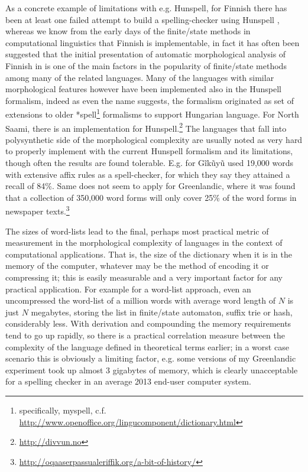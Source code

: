 \documentclass[officiallayout]{unihelcompling}
\begin{document}
As a concrete example of limitations with e.g. Hunspell, for Finnish there has
been at least one failed attempt to build a spelling-checker using Hunspell
\citep{pitkanen2006hunspell}, whereas we know from the early days of the
finite\-/state methods in computational linguistics that Finnish is
implementable, in fact it has often been suggested that the initial
presentation of automatic morphological analysis of Finnish in
\citet{koskenniemi1983twolevel} is one of the main factors in the popularity of
finite\-/state methods among many of the related languages. Many of the
languages with similar morphological features however have been implemented
also in the Hunspell formalism, indeed as even the name suggests, the formalism
originated as set of extensions to older *spell\footnote{specifically, 
    myspell, c.f.
\url{http://www.openoffice.org/lingucomponent/dictionary.html}} formalisms to
support Hungarian language.  For North Saami, there is an implementation for
Hunspell.\footnote{\url{http://divvun.no}} The languages that fall into polysynthetic side of the morphological
complexity are usually noted as very hard to properly implement with the
current Hunspell formalism and its limitations, though often the results are
found tolerable. E.g. for Gĩkũyũ \citet{chege2010developing} used 19,000 words
with extensive affix rules as a spell-checker, for which they say they attained
a recall of 84\%. Same does not seem to apply for Greenlandic, where it was
found that a collection of 350,000 word forms will only cover 25\% of the
word forms in newspaper
texts.\footnote{\url{http://oqaaserpassualeriffik.org/a-bit-of-history/}}

The sizes of word-lists lead to the final, perhaps most practical metric of
measurement in the morphological complexity of languages in the context of
computational applications. That is, the size of the dictionary when it is in
the memory of the computer, whatever may be the method of encoding it or
compressing it; this is easily measurable and a very important factor for any
practical application.  For example for a word-list approach, even an
uncompressed the word-list of a million words with average word length of $N$
is just $N$ megabytes, storing the list in finite\-/state automaton, suffix trie
or hash, considerably less. With derivation and compounding the memory
requirements tend to go up rapidly, so there is a practical correlation measure
between the complexity of the language defined in theoretical terms earlier; in
a worst case scenario this is obviously a limiting factor, e.g. some versions
of my Greenlandic experiment took up almost 3 gigabytes of memory, which is
clearly unacceptable for a spelling checker in an average 2013 end-user
computer system.
\end{document}
